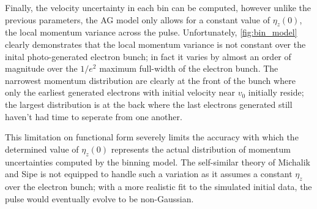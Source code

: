 
Finally, the velocity uncertainty in each bin can be computed, however unlike the previous parameters, the AG model only allows for a constant value of $\eta_z(0)$, the local momentum variance across the pulse.
Unfortunately, \ref{fig:bin_model} clearly demonstrates that the local momentum variance is not constant over the inital photo-generated electron bunch; in fact it varies by almost an order of magnitude over the $ 1/e^{2} $ maximum full-width of the electron bunch. 
The narrowest momentum distribution are clearly at the front of the bunch where only the earliest generated electrons with initial velocity near $ v_{ 0 } $ initially reside; the largest distribution is at the back where the last electrons generated still haven't had time to seperate from one another.

This limitation on functional form severely limits the accuracy with which the determined value of $\eta_z(0)$ represents the actual distribution of momentum uncertainties computed by the binning model.
The self-similar theory of Michalik and Sipe \cite{michalik_analytic_2006} is not equipped to handle such a variation as it assumes a constant $ \eta_{ z } $ over the electron bunch; with a more realistic fit to the simulated initial data, the pulse would eventually evolve to be non-Gaussian.

